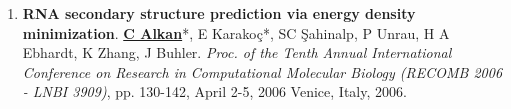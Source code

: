 \begin{enumerate}


\item
{\bf RNA secondary structure prediction via energy density minimization}.
{\bf {\underline{C Alkan}}}*, E Karako\c{c}*, SC \c{S}ahinalp, P Unrau,
H A Ebhardt, K Zhang, J Buhler.
{\em Proc. of the Tenth Annual International Conference on Research in Computational Molecular Biology
  (RECOMB 2006 - LNBI 3909)}, pp. 130-142,
  April 2-5, 2006 Venice, Italy, 2006.

\end{enumerate}




    

\vspace{-.4cm}
